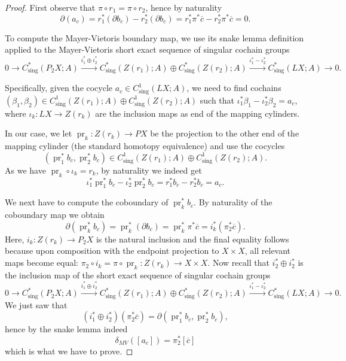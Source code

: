 \documentclass[10pt,a4paper]{amsart}
\newcommand{\boundary}[1]{\partial#1}
\DeclareMathOperator{\pr}{pr}
\DeclareMathOperator{\sing}{sing}
\begin{document}
\begin{proof}
  First observe that $\pi\circ r_1=\pi\circ r_2$, hence by naturality
  \begin{equation*}
    \boundary(a_c) =r_1^*(\boundary b_c)-r_2^*(\boundary b_c) =
    r_1^*\pi^*\overline c - r_2^*\pi^*\overline c =0.
  \end{equation*}

  To compute the Mayer-Vietoris boundary map, we use its snake lemma
  definition applied to the Mayer-Vietoris short exact sequence of singular cochain groups
  {\small
    \begin{equation*}
  0 \to C^*_{\sing}(P_2X;A) \xrightarrow{i_1^*\oplus i_2^*}
  C^*_{\sing}(Z(r_1);A)\oplus C^*_{\sing}(Z(r_2);A) \xrightarrow{ \iota_1^*
    -\iota_2^*} C^*_{\sing}(LX;A) \to 0.
\end{equation*}
}

Specifically, given the cocycle $a_c\in C^1_{\sing}(LX;A)$, we need to find
  cochains $(\beta_1,\beta_2)\in C^1_{\sing}(Z(r_1);A)\oplus
  C^1_{\sing}(Z(r_2);A)$ such that $\iota_1^*\beta_1 - \iota_2^*\beta_2 =
  a_c$, where $\iota_k\colon LX\to Z(r_k)$ are the
  inclusion maps as end of the mapping cylinders.

  In our case, we let $\pr_k\colon Z(r_k)\to PX$ be the projection to the
  other end of the mapping cylinder (the standard homotopy equivalence) and
  use the cocycles
  \begin{equation*}
(\pr_1^*b_c,\pr_2^*b_c)\in C^1_{\sing}(Z(r_1);A)\oplus
  C^1_{\sing}(Z(r_2);A).
\end{equation*}
As we have $\pr_k\circ\iota_k = r_k$, by naturality we indeed get
\begin{equation*}
\iota_1^*\pr_1^*b_c- \iota_2^*\pr_2^*b_c= r_1^*b_c-r_2^*b_c = a_c.
\end{equation*}


We next have to compute the coboundary of $\pr_k^*b_c$. By naturality of the
coboundary map we obtain
  \begin{equation*}
    \boundary(\pr_k^*b_c) = \pr_k^*(\boundary b_c) = \pr_k^*\pi^*\overline c =
    i_k^*(\pi_2^* \overline c).
  \end{equation*}
Here, $i_k\colon Z(r_k)\to P_2X$ is the natural inclusion and the final
equality follows because upon composition with the endpoint projection to
$X\times X$, all relevant maps become equal: $\pi_2 \circ i_k = \pi\circ
\pr_k\colon Z(r_k)\to X\times X$. Now recall that $i_2^*\oplus i_2^*$ is the
inclusion map of the short exact sequence of singular cochain groups
{\small
  \begin{equation*}
  0 \to C^*_{\sing}(P_2X;A) \xrightarrow{i_1^*\oplus i_2^*}
  C^*_{\sing}(Z(r_1);A)\oplus C^*_{\sing}(Z(r_2);A) \xrightarrow{ \iota_1^*
    -\iota_2^*} C^*_{\sing}(LX;A) \to 0.
\end{equation*}
}
We just saw that
\begin{equation*}
  (i_1^*\oplus i_2^*) (\pi_2^* \overline c) =\boundary(\pr_1^*b_c,\pr_2^*b_c),
\end{equation*}
hence by the snake lemma indeed
\begin{equation*}
  \delta_{MV}([a_c]) =\pi_2^*[\overline c]
\end{equation*}
which is what we have to prove.
\end{proof}
\end{document}
